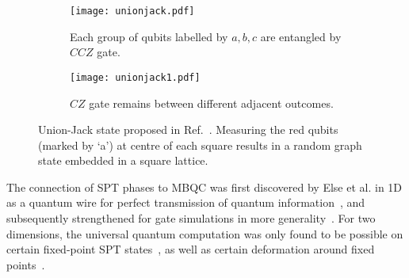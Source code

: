 \documentclass[aps,amsfonts,pra,twocolumn,showpacs]{revtex4-1}
\begin{document}
\begin{figure}[h]
	\begin{subfigure}{0.22\textwidth}
		\texttt{[image: unionjack.pdf]}
		\caption{Each group of qubits labelled by $a, b, c$ are entangled by $CCZ$ gate.}
	\end{subfigure}
	\hspace{1mm}
	\begin{subfigure}{0.22\textwidth}
		\texttt{[image: unionjack1.pdf]}
		\caption{$CZ$ gate remains between different adjacent outcomes.}
	\end{subfigure}
	\caption{Union-Jack state proposed in Ref.~\cite{Miller2016}. Measuring the red qubits (marked by `a') at centre of each square results in a random graph state embedded in a square lattice. \label{MM}}
\end{figure}
The connection of SPT phases to MBQC was first discovered by Else et al. in 1D as a quantum wire for perfect transmission of quantum information~\cite{Else,Prakash}, and  subsequently strengthened for gate simulations in more generality~\cite{MillerMiyake2015,Stephen17,Raussendorf17}. For two dimensions, the universal quantum computation was only found to be possible on certain fixed-point SPT states~\cite{Nautrup2015,Miller2016,Miller2016_2}, as well as certain deformation around fixed points~\cite{Wei2017}.   
\end{document}
